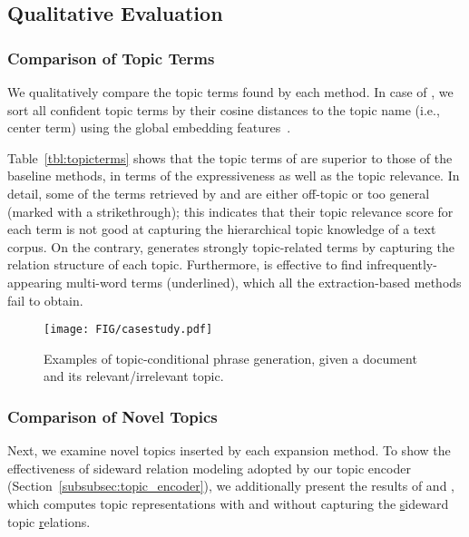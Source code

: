 \subsection{Qualitative Evaluation}
\subsubsection{Comparison of Topic Terms}
\label{subsubsec:topicterms}
We qualitatively compare the topic terms found by each method.
In case of \proposed, we sort all confident topic terms by their cosine distances to the topic name (i.e., center term) using the global embedding features~\cite{pennington2014glove}.

Table~\ref{tbl:topicterms} shows that the topic terms of \proposed are superior to those of the baseline methods, in terms of the expressiveness as well as the topic relevance.
In detail, some of the terms retrieved by \corel and \taxocom are either off-topic or too general (marked with a strikethrough);
this indicates that their topic relevance score for each term is not good at capturing the hierarchical topic knowledge of a text corpus.
On the contrary, \proposed generates strongly topic-related terms by capturing the relation structure of each topic.
Furthermore, \proposed is effective to find infrequently-appearing multi-word terms (underlined), which all the extraction-based methods fail to obtain.

\begin{figure}[t]
    \centering
    \texttt{[image: FIG/casestudy.pdf]}
    \caption{Examples of topic-conditional phrase generation, given a document and its relevant/irrelevant topic.}
    \label{fig:casestudy}
\end{figure}

\subsubsection{Comparison of Novel Topics}
\label{subsubsec:noveltopics}
Next, we examine novel topics inserted by each expansion method.
To show the effectiveness of sideward relation modeling adopted by our topic encoder (Section~\ref{subsubsec:topic_encoder}),
we additionally present the results of \textbf{\proposedfull} and \textbf{\proposedab}, which computes topic representations with and without capturing the \underline{s}ideward topic \underline{r}elations.

